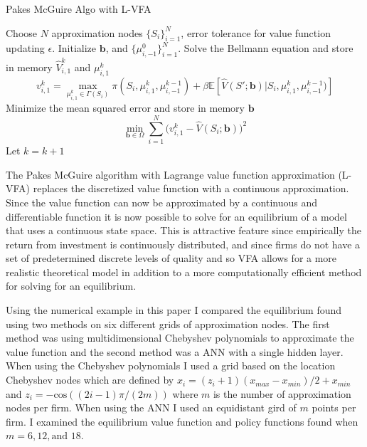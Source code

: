 \documentclass[12pt]{article}
\newcommand{\norm}[1]{\left\lVert#1\right\rVert}
\begin{document}
\begin{algorithm}[H]
  \caption{Pakes McGuire Algo with L-VFA}
  \begin{algorithmic}[1]
    \Procedure{}{} Choose $N$ approximation nodes $\{S_i\}_{i=1}^N$, error tolerance for value function updating $\epsilon$.
    \State Initialize $\boldsymbol{b}$, and $\{\mu^0_{i,-1}\}^N_{i=1}$.
    \While{$\norm{\hat{V}^{k}_1-\hat{V}^{k-1}_1} > \frac{\epsilon (1-\beta)}{2\beta}$}
    \State Solve the Bellmann equation and store in memory $\hat{V}^k_{i,1}$ and $\mu^k_{i,1}$
    \begin{equation*}
      v^k_{i,1}=\max_{\mu^k_{i,1} \in \Gamma(S_i)} \pi(S_i, \mu^k_{i,1}, \mu^{k-1}_{i,-1})+ \beta\mathbb{E}[\hat{V}(S';\boldsymbol{b})|S_i,\mu^k_{i,1},\mu^{k-1}_{i,-1})]
    \end{equation*}
    \State Minimize the mean squared error and store in memory $\boldsymbol{b}$
    \begin{equation*}
      \min_{\boldsymbol{b} \in \Omega} \sum_{i=1}^N \bigg ( v^k_{i,1} - \hat{V}(S_i;\boldsymbol{b}) \bigg)^2
    \end{equation*}
    \State Let $k=k+1$
    \EndFor
    \EndWhile
    \EndProcedure
  \end{algorithmic}
\end{algorithm}

The Pakes McGuire algorithm with Lagrange value function approximation (L-VFA) replaces the discretized value function with a continuous approximation. Since the value function can now be approximated by a continuous and differentiable function it is now possible to solve for an equilibrium of a model that uses a continuous state space. This is attractive feature since empirically the return from investment is continuously distributed, and since firms do not have a set of predetermined discrete levels of quality and so VFA allows for a more realistic theoretical model in addition to a more computationally efficient method for solving for an equilibrium.

Using the numerical example in this paper I compared the equilibrium found using two methods on six different grids of approximation nodes. The first method was using multidimensional Chebyshev polynomials to approximate the value function and the second method was a ANN with a single hidden layer. When using the Chebyshev polynomials I used a grid based on the location Chebyshev nodes which are defined by $x_i=(z_i+1)(x_{max}-x_{min})/2+x_{min}$ and $z_i=-\text{cos}((2i-1)\pi/(2m))$ where $m$ is the number of approximation nodes per firm. When using the ANN I used an equidistant gird of $m$ points per firm. I examined the equilibrium value function and policy functions found when $m=6,12,\text{and }18$.
\end{document}
